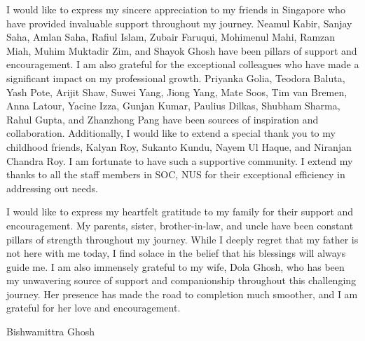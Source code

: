 \begin{acknowledgments}
I would like to express my sincere appreciation to my friends in Singapore who have provided invaluable support throughout my journey. Neamul Kabir, Sanjay Saha, Amlan Saha, Rafiul Islam, Zubair Faruqui, Mohimenul Mahi, Ramzan Miah, Muhim Muktadir Zim, and Shayok Ghosh have been pillars of support and encouragement. I am also grateful for the exceptional colleagues who have made a significant impact on my professional growth. Priyanka Golia, Teodora Baluta, Yash Pote, Arijit Shaw, Suwei Yang, Jiong Yang, Mate Soos, Tim van Bremen, Anna Latour, Yacine Izza, Gunjan Kumar, Paulius Dilkas, Shubham Sharma, Rahul Gupta, and Zhanzhong Pang have been sources of inspiration and collaboration. Additionally, I would like to extend a special thank you to my childhood friends, Kalyan Roy, Sukanto Kundu, Nayem Ul Haque, and Niranjan Chandra Roy.   I am fortunate to have such a supportive community. I extend my thanks to all the staff members in SOC, NUS for their exceptional efficiency in addressing out needs. 

I would like to express my heartfelt gratitude to my family for their support and encouragement. My parents, sister, brother-in-law, and uncle have been constant pillars of strength throughout my journey. While I deeply regret that my father is not here with me today, I find solace in the belief that his blessings will always guide me. I am also immensely grateful to my wife, Dola Ghosh, who has been my unwavering source of support and companionship throughout this challenging journey. Her presence has made the road to completion much smoother, and I am grateful for her love and encouragement. 



\begin{flushright}
	\vspace{1em}
	Bishwamittra Ghosh
\end{flushright}
	
\end{acknowledgments}
